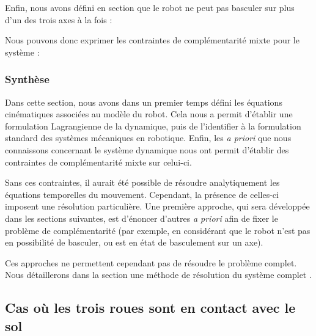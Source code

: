 				Enfin, nous avons défini en section  que le robot ne peut pas basculer sur plus d'un des trois axes à la fois :
				
				Nous pouvons donc exprimer les contraintes de complémentarité mixte pour le système :
				
			\subsubsection{Synthèse}
			
				Dans cette section, nous avons dans un premier temps défini les équations cinématiques associées au modèle du robot.
				Cela nous a permit d'établir une formulation Lagrangienne de la dynamique, puis de l'identifier à la formulation standard des systèmes mécaniques en robotique.
				Enfin, les \textit{a priori} que nous connaissons concernant le système dynamique nous ont permit d'établir des contraintes de complémentarité mixte sur celui-ci.
				
				
				
				Sans ces contraintes, il aurait été possible de résoudre analytiquement les équations temporelles du mouvement. Cependant, la présence de celles-ci imposent une résolution particulière.
				Une première approche, qui sera développée dans les sections suivantes, est d'énoncer d'autres \textit{a priori} afin de fixer le problème de complémentarité
				(par exemple, en considérant que le robot n'est pas en possibilité de basculer, ou est en état de basculement sur un axe). 
				
				Ces approches ne permettent cependant pas de résoudre le problème complet. 
				Nous détaillerons dans la section  une méthode de résolution du système complet .
		
		\subsection{Cas où les trois roues sont en contact avec le sol}
			
